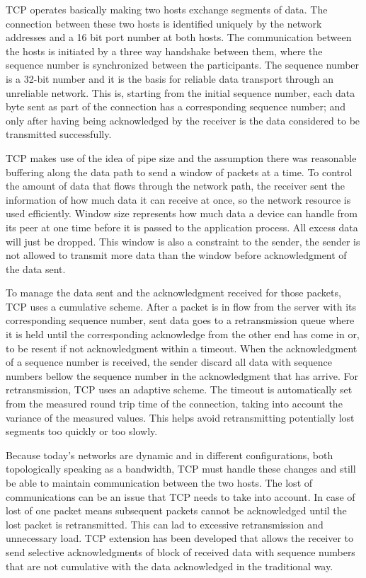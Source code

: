 TCP operates basically making two hosts exchange segments of data. The
connection between these two hosts is identified uniquely by the network addresses and a 16 bit port number at both hosts. The communication between the
hosts is initiated by a three way handshake between them, where the
sequence number is synchronized between the participants. The sequence number
is a 32-bit number and it is the basis for reliable data transport through an unreliable network. This is, starting from the initial sequence
number, each data byte sent as part of the connection has a corresponding
sequence number; and only after having being acknowledged by the receiver is
the data considered to be transmitted successfully.

TCP makes use of the idea of pipe size and the assumption there was reasonable buffering along the data path to send a window of packets at
a time. To control the amount of data that flows through the network path, the
receiver sent the information of how much data it can receive at once, so the
network resource is used efficiently. Window size represents how much data a
device can handle from its peer at one time before it is passed to the
application process. All excess data will just be dropped. This window
is also a constraint to the sender, the sender is not allowed to
transmit more data than the window before acknowledgment of the data sent.

To manage the data sent and the acknowledgment received for those packets, TCP
uses a cumulative scheme. After a packet is in flow from the server with its
corresponding sequence number, sent data goes to a retransmission queue where
it is held until the corresponding acknowledge from the other end has come in
or, to be resent if not acknowledgment within a timeout. When the
acknowledgment of a sequence number is received, the sender discard all data
with sequence numbers bellow the sequence number in the acknowledgment that
has arrive. For retransmission, TCP uses an adaptive scheme. The timeout is
automatically set from the measured round trip time of the connection,
taking into account the variance of the measured values\cite{JacobsonCAC}.
This helps avoid retransmitting potentially lost segments too quickly or too
slowly.

Because today's networks are dynamic and in different configurations, both
topologically speaking as a  bandwidth, TCP must handle these changes and
still be able to maintain communication between the two hosts. The lost of
communications can be an issue that TCP needs to take into account. In case of
lost of one packet means subsequent packets cannot be acknowledged until the
lost packet is retransmitted. This can lad to excessive retransmission and
unnecessary load. TCP extension has been developed that allows the receiver to
send selective acknowledgments of block of received data with sequence numbers
that are not cumulative with the data acknowledged in the traditional
way\cite{RFC2018}.

